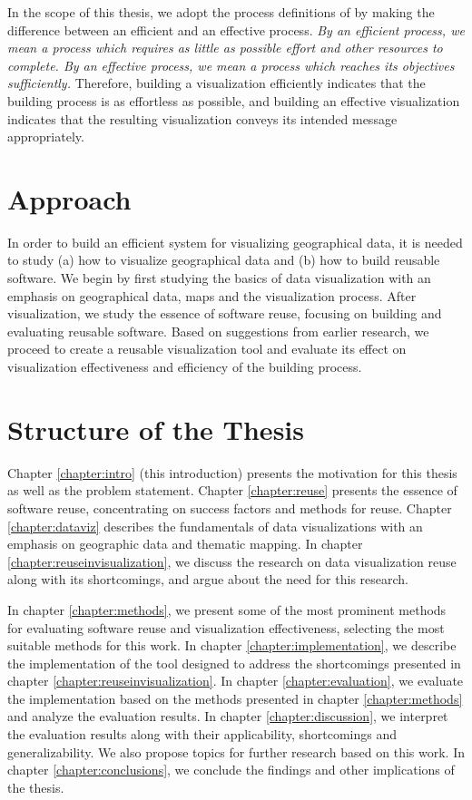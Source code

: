 In the scope of this thesis, we adopt the process definitions of \citet{van_wijk_value_2005} by making the difference between an efficient and an effective process. \emph{By an efficient process, we mean a process which requires as little as possible effort and other resources to complete. By an effective process, we mean a process which reaches its objectives sufficiently.} Therefore, building a visualization efficiently indicates that the building process is as effortless as possible, and building an effective visualization indicates that the resulting visualization conveys its intended message appropriately.



\section{Approach}

In order to build an efficient system for visualizing geographical data, it is needed to study (a) how to visualize geographical data and (b) how to build reusable software. We begin by first studying the basics of data visualization with an emphasis on geographical data, maps and the visualization process. After visualization, we study the essence of software reuse, focusing on building and evaluating reusable software. Based on suggestions from earlier research, we proceed to create a reusable visualization tool and evaluate its effect on visualization effectiveness and efficiency of the building process.

\section{Structure of the Thesis}
\label{section:structure} 

Chapter \ref{chapter:intro} (this introduction) presents the motivation for this thesis as well as the problem statement. Chapter \ref{chapter:reuse} presents the essence of software reuse, concentrating on success factors and methods for reuse. Chapter \ref{chapter:dataviz} describes the fundamentals of data visualizations with an emphasis on geographic data and thematic mapping. In chapter \ref{chapter:reuseinvisualization}, we discuss the research on data visualization reuse along with its shortcomings, and argue about the need for this research.

In chapter \ref{chapter:methods}, we present some of the most prominent methods for evaluating software reuse and visualization effectiveness, selecting the most suitable methods for this work. In chapter \ref{chapter:implementation}, we describe the implementation of the tool designed to address the shortcomings presented in chapter \ref{chapter:reuseinvisualization}. In chapter \ref{chapter:evaluation}, we evaluate the implementation based on the methods presented in chapter \ref{chapter:methods} and analyze the evaluation results. In chapter \ref{chapter:discussion}, we interpret the evaluation results along with their applicability, shortcomings and generalizability. We also propose topics for further research based on this work. In chapter \ref{chapter:conclusions}, we conclude the findings and other implications of the thesis.